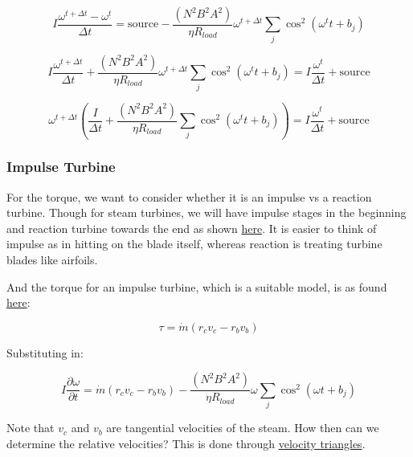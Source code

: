 \documentclass[masters]{ucbthesis}
\renewcommand{\_}{\kern-1.5pt\textunderscore\kern-1.5pt}
\begin{document}
\begin{equation*}
	I \frac{\omega^{t + \Delta t} - \omega^t}{\Delta t} = \text{source} 
	- \frac{( N^2 B^2 A^2 )}{\eta R_{load} }\omega^{t + \Delta t} 
	\sum_j \cos^2 (\omega^t t + b_j)  
\end{equation*}


\begin{equation*}
	I \frac{\omega^{t + \Delta t} }{\Delta t} 
	+ \frac{( N^2 B^2 A^2 )}{\eta R_{load} }\omega^{t + \Delta t} 
	\sum_j \cos^2 (\omega^t t + b_j)  
	= 
	I \frac{\omega^{t } }{\Delta t}
	+ \text{source} 
\end{equation*}



\begin{equation*}
	\omega^{t+ \Delta t} \left(
		\frac{I}{\Delta t} 
		+ \frac{( N^2 B^2 A^2 )}{\eta R_{load} } \sum_j \cos^2 (\omega^t t + b_j)  
\right)
	= 
	I \frac{\omega^{t } }{\Delta t}
	+ \text{source} 
\end{equation*}


\subsubsection{Impulse Turbine}

For the torque, we want to consider whether it is an impulse vs a 
reaction turbine. Though for steam turbines, we will have impulse 
stages in the beginning and reaction turbine towards the end 
as shown \href{https://www.youtube.com/watch?v=lL6Cf544Gjg}{here}.
It is easier to think of impulse as in hitting on the blade itself, whereas 
reaction is treating turbine blades like airfoils.

And the torque for an impulse turbine, which is a suitable model,
is as found \href{https://web.mit.edu/16.unified/www/FALL/thermodynamics/notes/node91.html}{here}:

\begin{equation*}
	\tau = \dot{m} (r_c v_c - r_b v_b)
\end{equation*}


Substituting in:

\begin{equation*}
	I \frac{\partial  \omega}{\partial t} = 
	\dot{m} (r_c v_c - r_b v_b) 
	- \frac{( N^2 B^2 A^2 )}{\eta R_{load} }\omega 
	\sum_j \cos^2 (\omega t + b_j)  
\end{equation*}

Note that $v_c$ and $v_b$ are tangential velocities of the steam.
How then can we determine the relative velocities? This is done 
through \href{https://www.youtube.com/watch?v=n1O8C6lb2Ho}{velocity triangles}.
\end{document}
